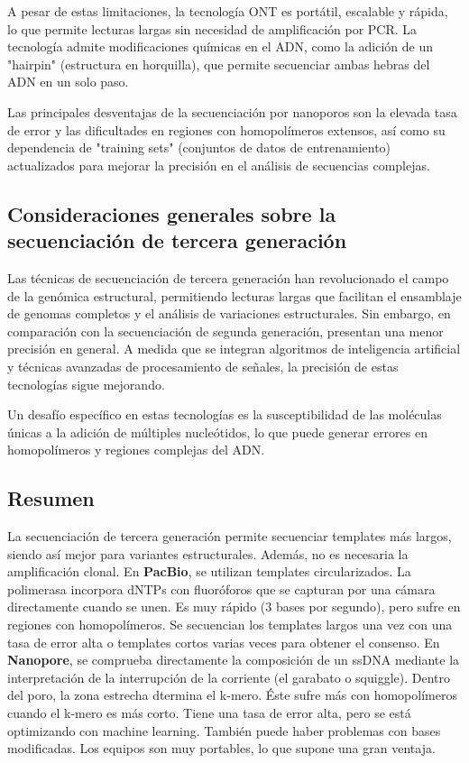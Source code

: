A pesar de estas limitaciones, la tecnología ONT es portátil, escalable y rápida, lo que permite lecturas largas sin necesidad de amplificación por PCR. La tecnología admite modificaciones químicas en el ADN, como la adición de un "hairpin" (estructura en horquilla), que permite secuenciar ambas hebras del ADN en un solo paso.

Las principales desventajas de la secuenciación por nanoporos son la elevada tasa de error y las dificultades en regiones con homopolímeros extensos, así como su dependencia de "training sets" (conjuntos de datos de entrenamiento) actualizados para mejorar la precisión en el análisis de secuencias complejas.

\subsection{Consideraciones generales sobre la secuenciación de tercera generación}
Las técnicas de secuenciación de tercera generación han revolucionado el campo de la genómica estructural, permitiendo lecturas largas que facilitan el ensamblaje de genomas completos y el análisis de variaciones estructurales. Sin embargo, en comparación con la secuenciación de segunda generación, presentan una menor precisión en general. A medida que se integran algoritmos de inteligencia artificial y técnicas avanzadas de procesamiento de señales, la precisión de estas tecnologías sigue mejorando.

Un desafío específico en estas tecnologías es la susceptibilidad de las moléculas únicas a la adición de múltiples nucleótidos, lo que puede generar errores en homopolímeros y regiones complejas del ADN.

\subsection{Resumen}
La secuenciación de tercera generación permite secuenciar templates más largos, siendo así mejor para variantes estructurales. Además, no es necesaria la amplificación clonal. En \textbf{PacBio}, se utilizan templates circularizados. La polimerasa incorpora dNTPs con fluoróforos que se capturan por una cámara directamente cuando se unen. Es muy rápido (3 bases por segundo), pero sufre en regiones con homopolímeros. Se secuencian los templates largos una vez con una tasa de error alta o templates cortos varias veces para obtener el consenso. En \textbf{Nanopore}, se comprueba directamente la composición de un ssDNA mediante la interpretación de la interrupción de la corriente (el garabato o squiggle). Dentro del poro, la zona estrecha dtermina el k-mero. Éste sufre más con homopolímeros cuando el k-mero es más corto. Tiene una tasa de error alta, pero se está optimizando con machine learning. También puede haber problemas con bases modificadas. Los equipos son muy portables, lo que supone una gran ventaja.

